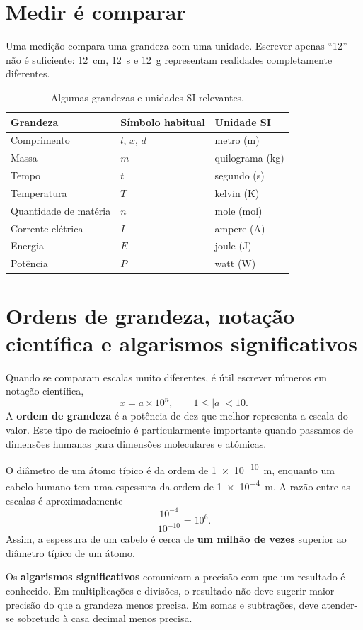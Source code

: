 \documentclass[11pt,a4paper,oneside]{book}
\begin{document}
\section{Medir é comparar}
Uma medição compara uma grandeza com uma unidade. Escrever apenas ``12'' não é suficiente: \SI{12}{cm}, \SI{12}{s} e \SI{12}{g} representam realidades completamente diferentes.

\begin{table}[H]
\centering
\caption{Algumas grandezas e unidades SI relevantes.}
\begin{tabular}{lll}
\toprule
Grandeza & Símbolo habitual & Unidade SI \\
\midrule
Comprimento & $l$, $x$, $d$ & metro (m) \\
Massa & $m$ & quilograma (kg) \\
Tempo & $t$ & segundo (s) \\
Temperatura & $T$ & kelvin (K) \\
Quantidade de matéria & $n$ & mole (mol) \\
Corrente elétrica & $I$ & ampere (A) \\
Energia & $E$ & joule (J) \\
Potência & $P$ & watt (W) \\
\bottomrule
\end{tabular}
\end{table}

\section{Ordens de grandeza, notação científica e algarismos significativos}
Quando se comparam escalas muito diferentes, é útil escrever números em notação científica,
\[
x=a\times10^n,\qquad 1\leq |a|<10.
\]
A \textbf{ordem de grandeza} é a potência de dez que melhor representa a escala do valor. Este tipo de raciocínio é particularmente importante quando passamos de dimensões humanas para dimensões moleculares e atómicas.

\begin{exemplo}[title=Exemplo resolvido -- ordem de grandeza]
O diâmetro de um átomo típico é da ordem de \SI{1e-10}{m}, enquanto um cabelo humano tem uma espessura da ordem de \SI{1e-4}{m}. A razão entre as escalas é aproximadamente
\[
\frac{10^{-4}}{10^{-10}}=10^6.
\]
Assim, a espessura de um cabelo é cerca de \textbf{um milhão de vezes} superior ao diâmetro típico de um átomo.
\end{exemplo}

Os \textbf{algarismos significativos} comunicam a precisão com que um resultado é conhecido. Em multiplicações e divisões, o resultado não deve sugerir maior precisão do que a grandeza menos precisa. Em somas e subtrações, deve atender-se sobretudo à casa decimal menos precisa.
\end{document}
